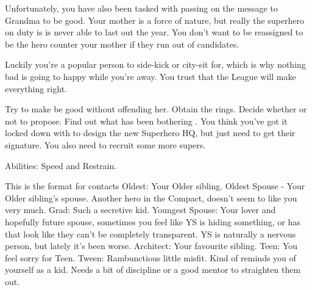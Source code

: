 \documentclass[char]{LRSguildcamp1}
\begin{document}
Unfortunately, you have also been tasked with passing on the message to Grandma to be good. Your mother is a force of nature, but really the superhero on duty is \pCityGrandma{} is never able to last out the year. You don't want to be reassigned to be the hero counter your mother if they run out of candidates. 

Luckily you're a popular person to side-kick or city-sit for, which is why nothing bad is going to happy while you're away. You trust that the League will make everything right. 


\begin{itemz}[Goals]
	\item 
	Try to make \cGrandma{} be good without offending her. 
	Obtain the rings.
	Decide whether or not to propose. 
	Find out what has been bothering \cYS{}. 
	You think you’ve got it locked down with \cArchitect{} to design the new Superhero HQ, but just need to get their signature. 
	You also need to recruit some more supers. 
	
\end{itemz}

\begin{itemz}[Notes]
	\item 
	Abilities: Speed and Restrain.
\end{itemz}

\begin{contacts}
	\contact{}  This is the format for contacts 
	Oldest: Your Older sibling. 
	Oldest Spouse - Your Older sibling’s spouse. Another hero in the Compact, doesn’t seem to like you very much. 
	Grad: Such a secretive kid. 
	Youngest Spouse: Your lover and hopefully future spouse, sometimes you feel like YS is hiding something, or has that look like they can’t be completely transparent. YS is naturally a nervous person, but lately it’s been worse. 
	Architect: Your favourite sibling. 
	Teen: You feel sorry for Teen. 
	Tween: Rambunctious little misfit. Kind of reminds you of yourself as a kid. Needs a bit of discipline or a good mentor to straighten them out. 
	
\end{contacts}
\end{document}
